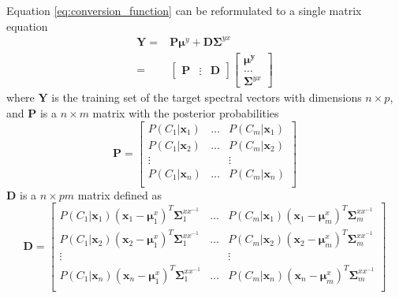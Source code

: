 Equation \eqref{eq:conversion_function} can be reformulated to a single matrix equation
\begin{equation}
	\label{eq:least_square_problem}
	\begin{split}
		\mathbf{Y} = &\mathbf{P}\boldsymbol{\mu}^y + \mathbf{D}\mathbf{\Sigma}^{yx} \\
		= & \begin{bmatrix}
			\mathbf{P}& \vdots &\mathbf{D}
		\end{bmatrix}
		\begin{bmatrix}
			\boldsymbol{\mu^y} \\
			\dots \\
			\mathbf{\Sigma}^{yx}
		\end{bmatrix}
	\end{split}
\end{equation}
where $\mathbf{Y}$ is the training set of the target spectral vectors with dimensions $n\times p$, and $\mathbf{P}$ is a $n \times m$ matrix with the posterior probabilities
\begin{equation}
	\label{eq:P_matrix}
	\mathbf{P} = \begin{bmatrix}
		P(C_1\vert \mathbf{x}_1) & \dots & P(C_m\vert \mathbf{x}_1) \\
		P(C_1\vert \mathbf{x}_2) & \dots & P(C_m\vert \mathbf{x}_2) \\
		\vdots & & \vdots \\
		P(C_1\vert \mathbf{x}_n) & \dots & P(C_m\vert \mathbf{x}_n) \\
	\end{bmatrix}
\end{equation}
$\mathbf{D}$ is a $n \times pm$ matrix defined as
\begin{equation}
	\label{eq:D_matrix}
	\mathbf{D} = \begin{bmatrix}
		P(C_1\vert \mathbf{x}_1)(\mathbf{x}_1 - \boldsymbol{\mu}_1^x)^T\mathbf{\Sigma}_1^{xx^{-1}} & \dots & P(C_m\vert \mathbf{x}_1)(\mathbf{x}_1 - \boldsymbol{\mu}_m^x)^T\mathbf{\Sigma}_m^{xx^{-1}} \\
		P(C_1\vert \mathbf{x}_2)(\mathbf{x}_2 - \boldsymbol{\mu}_1^x)^T\mathbf{\Sigma}_1^{xx^{-1}} & \dots & P(C_m\vert \mathbf{x}_2)(\mathbf{x}_2 - \boldsymbol{\mu}_m^x)^T\mathbf{\Sigma}_m^{xx^{-1}} \\
		\vdots & & \vdots \\
		P(C_1\vert \mathbf{x}_n)(\mathbf{x}_n - \boldsymbol{\mu}_1^x)^T\mathbf{\Sigma}_1^{xx^{-1}} & \dots & P(C_m\vert \mathbf{x}_n)(\mathbf{x}_n - \boldsymbol{\mu}_m^x)^T\mathbf{\Sigma}_m^{xx^{-1}} \\
	\end{bmatrix}
\end{equation}

